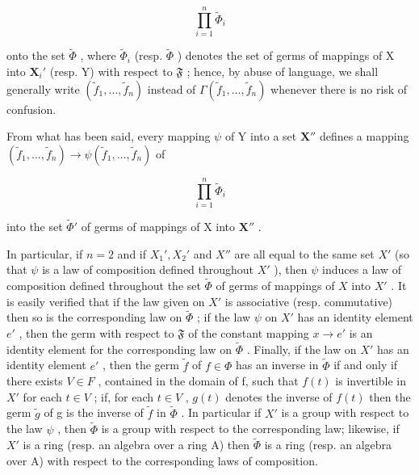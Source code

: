 \[
\prod_ {i = 1} ^ {n} \tilde {\Phi} _ {i}
\]

onto the set \(\tilde{\Phi}\) , where \(\tilde{\Phi}_i\) (resp. \(\tilde{\Phi}\) ) denotes the set of germs of mappings of X into \(\mathbf{X}_i'\) (resp. Y) with respect to \(\mathfrak{F}\) ; hence, by abuse of language, we shall generally write \((\tilde{f}_1, \ldots, \tilde{f}_n)\) instead of \(\Gamma(\tilde{f}_1, \ldots, \tilde{f}_n)\) whenever there is no risk of confusion.

From what has been said, every mapping \(\psi\) of Y into a set \(\mathbf{X}''\) defines a mapping \((\tilde{f}_1, \ldots, \tilde{f}_n) \to \psi(\tilde{f}_1, \ldots, \tilde{f}_n)\) of

\[
\prod_ {i = 1} ^ {n} \tilde {\Phi} _ {i}
\]

into the set \(\tilde{\Phi}'\) of germs of mappings of X into \(\mathbf{X}''\) .

In particular, if \(n = 2\) and if \(X_1', X_2'\) and \(X''\) are all equal to the same set \(X'\) (so that \(\psi\) is a law of composition defined throughout \(X'\) ), then \(\psi\) induces a law of composition defined throughout the set \(\tilde{\Phi}\) of germs of mappings of \(X\) into \(X'\) . It is easily verified that if the law given on \(X'\) is associative (resp. commutative) then so is the corresponding law on \(\tilde{\Phi}\) ; if the law \(\psi\) on \(X'\) has an identity element \(e'\) , then the germ with respect to \(\mathfrak{F}\) of the constant mapping \(x \to e'\) is an identity element for the corresponding law on \(\tilde{\Phi}\) . Finally, if the law on \(X'\) has an identity element \(e'\) , then the germ \(\tilde{f}\) of \(f \in \Phi\) has an inverse in \(\tilde{\Phi}\) if and only if there exists \(V \in F\) , contained in the domain of f, such that \(f(t)\) is invertible in \(X'\) for each \(t \in V\) ; if, for each \(t \in V\) , \(g(t)\) denotes the inverse of \(f(t)\) then the germ \(\tilde{g}\) of g is the inverse of \(\tilde{f}\) in \(\tilde{\Phi}\) . In particular if \(X'\) is a group with respect to the law \(\psi\) , then \(\tilde{\Phi}\) is a group with respect to the corresponding law; likewise, if \(X'\) is a ring (resp. an algebra over a ring A) then \(\tilde{\Phi}\) is a ring (resp. an algebra over A) with respect to the corresponding laws of composition.

